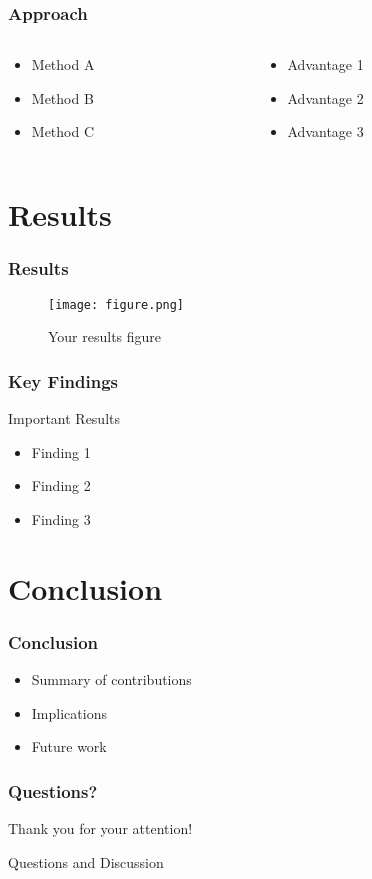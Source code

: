 \documentclass{beamer}
\begin{document}
\begin{frame}
\frametitle{Approach}
\begin{columns}
\begin{column}{0.5\textwidth}
\begin{itemize}
    \item Method A
    \item Method B
    \item Method C
\end{itemize}
\end{column}
\begin{column}{0.5\textwidth}
\begin{itemize}
    \item Advantage 1
    \item Advantage 2
    \item Advantage 3
\end{itemize}
\end{column}
\end{columns}
\end{frame}

\section{Results}
\begin{frame}
\frametitle{Results}
\begin{figure}
\centering
\texttt{[image: figure.png]}
\caption{Your results figure}
\end{figure}
\end{frame}

\begin{frame}
\frametitle{Key Findings}
\begin{alertblock}{Important Results}
\begin{itemize}
    \item Finding 1
    \item Finding 2
    \item Finding 3
\end{itemize}
\end{alertblock}
\end{frame}

\section{Conclusion}
\begin{frame}
\frametitle{Conclusion}
\begin{itemize}
    \item Summary of contributions
    \item Implications
    \item Future work
\end{itemize}
\end{frame}

\begin{frame}
\frametitle{Questions?}
\begin{center}
\Large Thank you for your attention!

\vspace{1cm}
Questions and Discussion
\end{center}
\end{frame}
\end{document}
